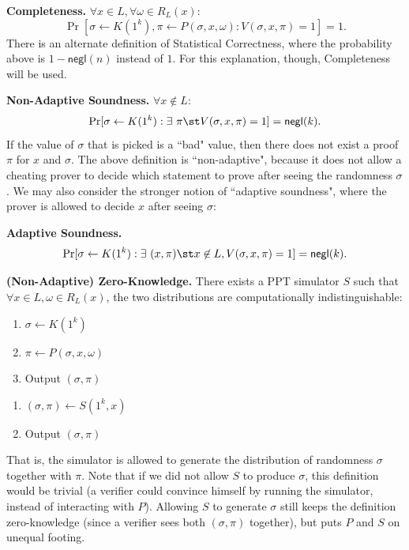 \documentclass[12pt]{tufte-book}
\begin{document}
\medskip
\noindent\textbf{Completeness.} $\forall x \in L, \forall \omega \in R_L(x)$:
    $$\Pr[\sigma \gets K(1^k), \pi \gets P(\sigma, x, \omega) : V(\sigma, x,
    \pi) = 1] = 1.$$
There is an alternate definition of Statistical Correctness, where the probability above is $1 - \mathsf{negl}(n)$ instead of $1$. For this explanation, though, Completeness will be used.

\medskip
\noindent\textbf{Non-Adaptive Soundness.} $\forall x \not\in L$:
    $$\Pr[\sigma \gets K(1^k): \exists~\pi \st V(\sigma, x, \pi)
    = 1] = \mathsf{negl}(k).$$
If the value of $\sigma$ that is picked is a ``bad" value, then there does not exist a proof $\pi$ for $x$ and $\sigma$. The above definition is ``non-adaptive", because it does not allow a cheating
prover to decide which statement to prove after seeing the randomness $\sigma$.
We may also consider the stronger notion of ``adaptive soundness", where the
prover is allowed to decide $x$ after seeing $\sigma$:

\medskip
\noindent\textbf{Adaptive Soundness.}
    $$\Pr[\sigma \gets K(1^k): \exists~ (x, \pi) \st  x \not\in L, V(\sigma, x, \pi)
    = 1] = \mathsf{negl}(k).$$

\medskip
\noindent\textbf{(Non-Adaptive) Zero-Knowledge.}
    There exists a PPT simulator $S$ such that $\forall x \in L, \omega \in
    R_L(x)$, the two distributions are computationally indistinguishable:

\begin{minipage}{0.5\textwidth}
    \begin{enumerate}[itemsep=-3pt]
        \item $\sigma \gets K(1^k)$
        \item $\pi \gets P(\sigma, x, \omega)$
        \item Output $(\sigma, \pi)$
    \end{enumerate}
\end{minipage}
\begin{minipage}{0.5\textwidth}
    \begin{enumerate}
        \item $(\sigma, \pi) \gets S(1^k, x)$
        \item Output $(\sigma, \pi)$
    \end{enumerate}
\end{minipage}

\medskip
That is, the simulator is allowed to generate the distribution of randomness
$\sigma$ together with $\pi$. Note that if we did not allow $S$ to produce
$\sigma$, this definition would be trivial (a verifier could convince himself by
running the simulator, instead of interacting with $P$). Allowing $S$ to
generate $\sigma$ still keeps the definition zero-knowledge (since a verifier sees both $(\sigma,
\pi)$ together), but puts $P$ and $S$ on unequal footing.
\end{document}
